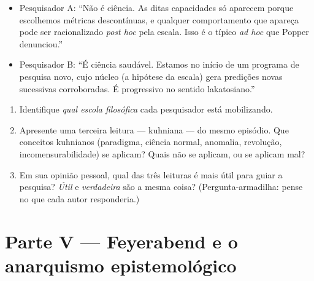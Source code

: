 \documentclass[10pt,a4paper]{extarticle}
\newcommand{\impt}[1]{\textcolor{important}{#1}}
\begin{document}
\begin{enumerate}[label=\textbf{\arabic*.}, leftmargin=*, start=17]
\begin{itemize}
    \item Pesquisador A: ``Não é ciência. As ditas capacidades só aparecem porque escolhemos métricas descontínuas, e qualquer comportamento que apareça pode ser racionalizado \emph{post hoc} pela escala. Isso é o típico \emph{ad hoc} que Popper denunciou.''
    \item Pesquisador B: ``É ciência saudável. Estamos no início de um programa de pesquisa novo, cujo núcleo (a hipótese da escala) gera predições novas sucessivas corroboradas. É progressivo no sentido lakatosiano.''
\end{itemize}

\begin{enumerate}[label=(\alph*)]
    \item Identifique \emph{qual escola filosófica} cada pesquisador está mobilizando.
    \item Apresente uma terceira leitura --- \impt{kuhniana} --- do mesmo episódio. Que conceitos kuhnianos (paradigma, ciência normal, anomalia, revolução, incomensurabilidade) se aplicam? Quais não se aplicam, ou se aplicam mal?
    \item Em sua opinião pessoal, qual das três leituras é mais útil para guiar a pesquisa? \emph{Útil} e \emph{verdadeira} são a mesma coisa? (Pergunta-armadilha: pense no que cada autor responderia.)
\end{enumerate}

\end{enumerate}

\section*{Parte V --- Feyerabend e o anarquismo epistemológico}
\end{document}
